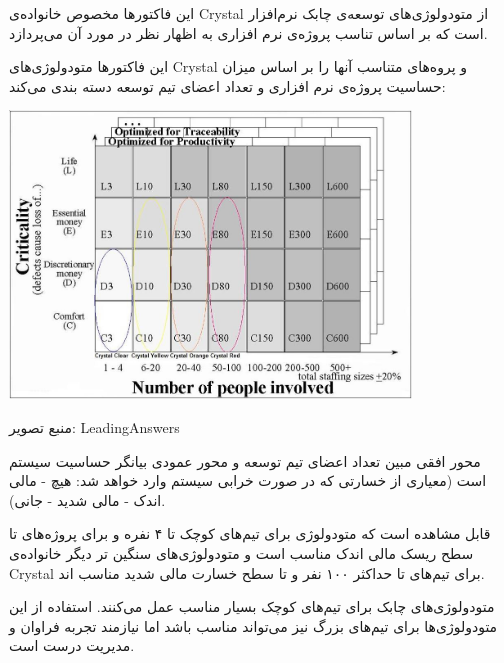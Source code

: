 \begin{enumerate}[i]
این فاکتور‌ها مخصوص خانواده‌ی Crystal از متودولوژی‌های توسعه‌ی چابک نرم‌افزار است که بر اساس تناسب پروژه‌ی نرم افزاری به اظهار نظر در مورد آن می‌پردازد.

این فاکتور‌ها متودولوژی‌های Crystal و پروه‌های متناسب آنها را بر اساس میزان حساسیت پروژه‌ی نرم افزاری و تعداد اعضای تیم توسعه دسته بندی می‌کند:

\begin{center}
\includegraphics[width=0.8\textwidth]{images/Agile-Crystal}

منبع تصویر:
LeadingAnswers
\end{center}


محور افقی مبین تعداد اعضای تیم توسعه و محور عمودی بیانگر حساسیت سیستم است (معیاری از خسارتی که در صورت خرابی سیستم وارد خواهد شد: هیچ - مالی اندک - مالی شدید - جانی).

قابل مشاهده است که متودولوژی  برای تیم‌های کوچک تا ۴ نفره و برای پروژه‌های تا سطح ریسک مالی اندک مناسب است و متودولوژی‌های سنگین تر دیگر خانواده‌ی Crystal برای تیم‌های تا حداکثر ۱۰۰ نفر و تا سطح خسارت مالی شدید مناسب اند.

متودولوژی‌های چابک برای تیم‌های کوچک بسیار مناسب عمل می‌کنند. استفاده از این متودولوژی‌ها برای تیم‌های بزرگ نیز می‌تواند مناسب باشد اما نیازمند تجربه فراوان و مدیریت درست است.
\cite{agile-suitability-filters}

\end{enumerate}